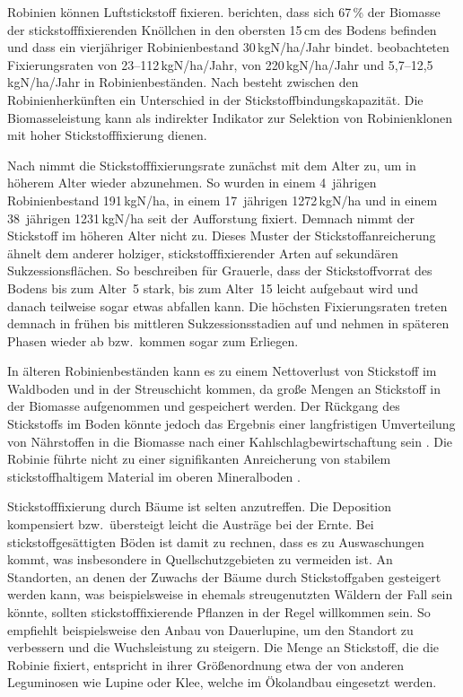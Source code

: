 \documentclass[twocolumn]{scrartcl}
\begin{document}
Robinien können Luftstickstoff fixieren.
\citet{boring1984robinieN} berichten, dass sich 67\,\% der Biomasse der stickstofffixierenden Knöllchen in den obersten 15\,cm des Bodens befinden und dass ein vierjähriger Robinienbestand 30\,kgN/ha/Jahr bindet.
\citet{noh2009robinieN} beobachteten Fixierungsraten von 23--112\,kgN/ha/Jahr, \citet{danso1995robinieN} von 220\,kgN/ha/Jahr und \citet{marron2018robinieN} 5,7--12,5\,kgN/ha/Jahr in Robinienbeständen.
Nach \citet{moshki2011robinieN} besteht zwischen den Robinienherkünften ein Unterschied in der Stickstoffbindungskapazität. Die Biomasseleistung kann als indirekter Indikator zur Selektion von Robinienklonen mit hoher Stickstofffixierung dienen.

Nach \citet{boring1984robinie} nimmt die Stickstofffixierungsrate zunächst mit dem Alter zu, um in höherem Alter wieder abzunehmen. So wurden in einem 4~jährigen Robinienbestand 191\,kgN/ha, in einem 17~jährigen 1272\,kgN/ha und in einem 38~jährigen 1231\,kgN/ha seit der Aufforstung fixiert. Demnach nimmt der Stickstoff im höheren Alter nicht zu. Dieses Muster der Stickstoffanreicherung ähnelt dem anderer holziger, stickstofffixierender Arten auf sekundären Sukzessionsflächen.
So beschreiben \citet{cleve1971grauerle} für Grauerle, dass der Stickstoffvorrat des Bodens bis zum Alter~5 stark, bis zum Alter~15 leicht aufgebaut wird und danach teilweise sogar etwas abfallen kann. Die höchsten Fixierungsraten treten demnach in frühen bis mittleren Sukzessionsstadien auf und nehmen in späteren Phasen wieder ab bzw.\ kommen sogar zum Erliegen.

In älteren Robinienbeständen kann es zu einem Nettoverlust von Stickstoff im Waldboden und in der Streuschicht kommen, da große Mengen an Stickstoff in der Biomasse aufgenommen und gespeichert werden. Der Rückgang des Stickstoffs im Boden könnte jedoch das Ergebnis einer langfristigen Umverteilung von Nährstoffen in die Biomasse nach einer Kahlschlagbewirtschaftung sein \citep{boring1984robinie}.
Die Robinie führte nicht zu einer signifikanten Anreicherung von stabilem stickstoffhaltigem Material im oberen Mineralboden \citep{auten1945robinieN}.

Stickstofffixierung durch Bäume ist selten anzutreffen. Die Deposition kompensiert bzw.\ übersteigt leicht die Austräge bei der Ernte. Bei stickstoffgesättigten Böden ist damit zu rechnen, dass es zu Auswaschungen kommt, was insbesondere in Quellschutzgebieten zu vermeiden ist. An Standorten, an denen der Zuwachs der Bäume durch Stickstoffgaben gesteigert werden kann, was beispielsweise in ehemals streugenutzten Wäldern der Fall sein könnte, sollten stickstofffixierende Pflanzen in der Regel willkommen sein. So empfiehlt beispielsweise \citet{wiedemann1951ertragskunde} den Anbau von Dauerlupine, um den Standort zu verbessern und die Wuchsleistung zu steigern. Die Menge an Stickstoff, die die Robinie fixiert, entspricht in ihrer Größenordnung etwa der von anderen Leguminosen wie Lupine oder Klee, welche im Ökolandbau eingesetzt werden.
\end{document}
